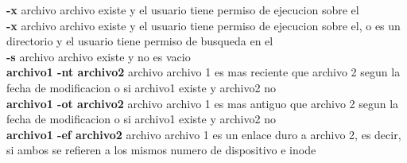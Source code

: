 \documentclass[11pt]{article}
\begin{document}
\hspace{2cm} \textbf{-x} archivo \hspace{2cm} archivo existe y el usuario tiene permiso de ejecucion sobre el \\

\hspace{2cm} \textbf{-x} archivo \hspace{2cm} archivo existe y el usuario tiene permiso de ejecucion sobre el, o es un directorio y el usuario tiene permiso de busqueda en el \\

\hspace{2cm} \textbf{-s} archivo \hspace{2cm} archivo existe y no es vacio \\

\hspace{2cm} \textbf{archivo1 -nt archivo2} archivo \hspace{2cm} archivo 1 es mas reciente que archivo 2 segun la fecha de modificacion o si archivo1 existe y archivo2 no\\

\hspace{2cm} \textbf{archivo1 -ot archivo2} archivo \hspace{2cm} archivo 1 es mas antiguo que archivo 2 segun la fecha de modificacion o si archivo1 existe y archivo2 no\\


\hspace{2cm} \textbf{archivo1 -ef archivo2} archivo \hspace{2cm} archivo 1 es un enlace duro a archivo 2, es decir, si ambos se refieren a los mismos numero de dispositivo e inode\\




 



\hspace{2cm} 

\hspace{2cm}
\end{document}
